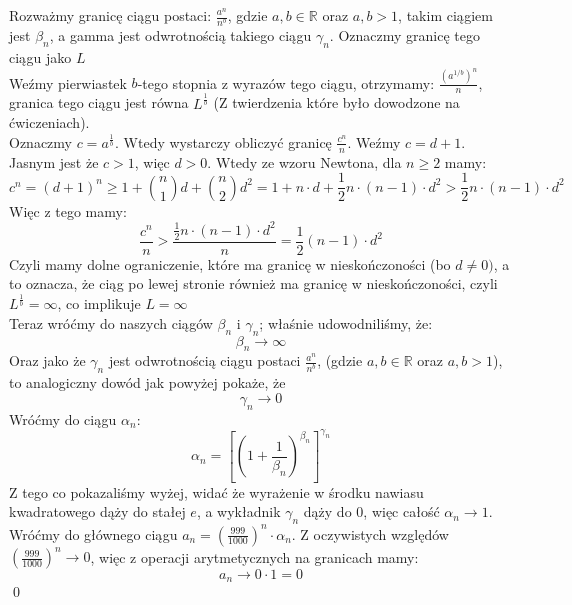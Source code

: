 \documentclass[12pt]{article}
\newcommand{\R}{\mathbb{R}}
\begin{document}
Rozważmy granicę ciągu postaci: $\displaystyle\frac{a^n}{n^b}$, gdzie $a, b \in \R$ oraz $a, b > 1$, takim ciągiem jest $\beta_n$, a gamma jest odwrotnością takiego ciągu $\gamma_n$. Oznaczmy granicę tego ciągu jako $L$\\[5pt]
Weźmy pierwiastek $b$-tego stopnia z wyrazów tego ciągu, otrzymamy: $\frac{\left(a^{1/b}\right)^n}{n}$, granica tego ciągu jest równa $L^{\frac{1}{b}}$ (Z twierdzenia które było dowodzone na ćwiczeniach). \\[5pt]
Oznaczmy $c = a^{\frac{1}{b}}$. Wtedy wystarczy obliczyć granicę $\frac{c^n}{n}$. Weźmy $c = d + 1$. Jasnym jest że $c > 1$, więc $d > 0$. Wtedy ze wzoru Newtona, dla $n \geq 2$ mamy:
$$c^n = (d+1)^n \geq 1 + {n \choose 1} d + {n \choose 2} d^2 = 1 + n\cdot d + \frac{1}{2} n \cdot (n - 1) \cdot d^2 > \frac{1}{2} n \cdot (n - 1) \cdot d^2$$
Więc z tego mamy:
$$\frac{c^n}{n} > \frac{\frac{1}{2} n \cdot (n - 1) \cdot d^2}{n} = \frac{1}{2} (n - 1) \cdot d^2$$
Czyli mamy dolne ograniczenie, które ma granicę w nieskończoności (bo $d \neq 0)$, a to oznacza, że ciąg po lewej stronie również ma granicę w nieskończoności, czyli $L^{\frac{1}{b}} = \infty$, co implikuje $L = \infty$ \\[5pt]
Teraz wróćmy do naszych ciągów $\beta_n$ i $\gamma_n$; właśnie udowodniliśmy, że:
$$\beta_n \to \infty$$
Oraz jako że $\gamma_n$ jest odwrotnością ciągu postaci $\displaystyle\frac{a^n}{n^b}$, (gdzie $a, b \in \R$ oraz $a, b > 1$), to analogiczny dowód jak powyżej pokaże, że 
$$\gamma_n \to 0$$
Wróćmy do ciągu $\alpha_n$:
$$\alpha_n = \left[\left(1 + \frac{1}{\beta_n}\right)^{\beta_n}\right]^{\gamma_n}$$
Z tego co pokazaliśmy wyżej, widać że wyrażenie w środku nawiasu kwadratowego dąży do stałej $e$, a wykładnik $\gamma_n$ dąży do $0$, więc całość  $\alpha_n \to 1$. \\[5pt]
Wróćmy do głównego ciągu $a_n = \left(\frac{999}{1000}\right)^n \cdot \alpha_n$. Z oczywistych względów $\left(\frac{999}{1000}\right)^n \to 0$, więc z operacji arytmetycznych na granicach mamy:
$$a_n \to 0 \cdot 1 = 0$$
\qed
\end{document}
